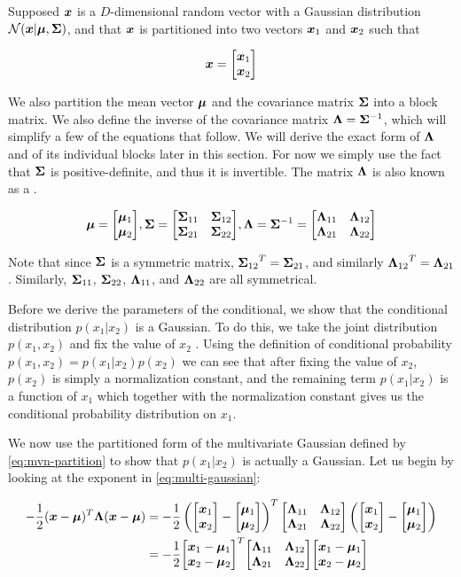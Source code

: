 Supposed $\vx$ is a $D$-dimensional random vector with a Gaussian distribution $\gN(\vx | \vmu, \mSigma)$, and that $\vx$ is partitioned into two vectors $\vx_1$ and $\vx_2$ such that

\begin{equation}
\vx = \partx
\end{equation}

We also partition the mean vector $\vmu$ and the covariance matrix $\mSigma$ into a block matrix. We also define the inverse of the covariance matrix $\mLambda = \mSigma^{-1}$, which will simplify a few of the equations that follow. We will derive the exact form of $\mLambda$ and of its individual blocks later in this section. For now we simply use the fact that $\mSigma$ is positive-definite, and thus it is invertible. The matrix $\mLambda$ is also known as a .

\begin{equation}
\vmu = \partmu,
\mSigma = \partsigma, \mLambda = \mSigma^{-1} = \partlambda \label{eq:mvn-partition}
\end{equation}

Note that since $\mSigma$ is a symmetric matrix, $\ms{12}^T = \ms{21}$, and similarly $\ml{12}^T = \ml{21}$. Similarly, $\ms{11}$, $\ms{22}$, $\ml{11}$, and $\ml{22}$ are all symmetrical.

Before we derive the parameters of the conditional, we show that the conditional distribution $p(x_1 | x_2)$ is a Gaussian. To do this, we take the joint distribution $p(x_1, x_2)$ and fix the value of $x_2$ \citep{bishop2016pattern}. Using the definition of conditional probability $p(x_1, x_2) = p(x_1 | x_2) p(x_2)$ we can see that after fixing the value of $x_2$, $p(x_2)$ is simply a normalization constant, and the remaining term $p(x_1 | x_2)$ is a function of $x_1$ which together with the normalization constant gives us the conditional probability distribution on $x_1$.

We now use the partitioned form of the multivariate Gaussian defined by \eqref{eq:mvn-partition} to show that $p(x_1 | x_2)$ is actually a Gaussian. Let us begin by looking at the exponent in \eqref{eq:multi-gaussian}:

\begin{align}
-\frac{1}{2} (\vx - \vmu)^T \mLambda (\vx - \vmu) &= 
-\frac{1}{2} \left(\partx - \partmu \right)^T \partlambda \left(\partx - \partmu \right) \\
&= -\frac{1}{2} \partxmu^T \partlambda \partxmu
\end{align}

